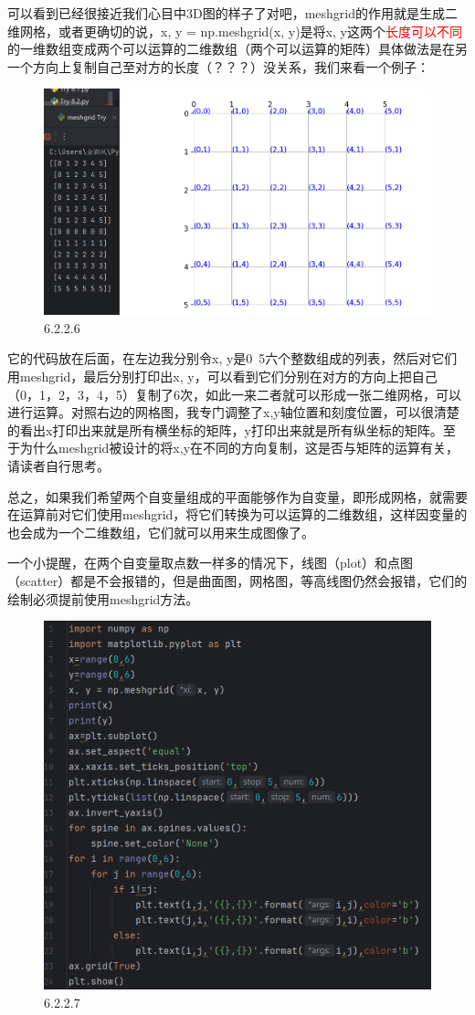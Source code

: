 \documentclass[12pt]{article}
\begin{document}
可以看到已经很接近我们心目中3D图的样子了对吧，meshgrid的作用就是生成二维网格，或者更确切的说，x, y = np.meshgrid(x, y)是将x, y这两个\textcolor{red}{长度可以不同}的一维数组变成两个可以运算的二维数组（两个可以运算的矩阵）具体做法是在另一个方向上复制自己至对方的长度（？？？）没关系，我们来看一个例子：
\begin{figure}[H]
    \centering
    \includegraphics[width=1\linewidth]{3D mesh Pic3.png}
    \caption{6.2.2.6}
    \label{fig:enter-label}
\end{figure}
它的代码放在后面，在左边我分别令x, y是0~5六个整数组成的列表，然后对它们用meshgrid，最后分别打印出x, y，可以看到它们分别在对方的方向上把自己（0，1，2，3，4，5）复制了6次，如此一来二者就可以形成一张二维网格，可以进行运算。对照右边的网格图，我专门调整了x,y轴位置和刻度位置，可以很清楚的看出x打印出来就是所有横坐标的矩阵，y打印出来就是所有纵坐标的矩阵。至于为什么meshgrid被设计的将x,y在不同的方向复制，这是否与矩阵的运算有关，请读者自行思考。

总之，如果我们希望两个自变量组成的平面能够作为自变量，即形成网格，就需要在运算前对它们使用meshgrid，将它们转换为可以运算的二维数组，这样因变量的也会成为一个二维数组，它们就可以用来生成图像了。

一个小提醒，在两个自变量取点数一样多的情况下，线图（plot）和点图（scatter）都是不会报错的，但是曲面图，网格图，等高线图仍然会报错，它们的绘制必须提前使用meshgrid方法。
\begin{figure}[H]
    \centering
    \includegraphics[width=0.75\linewidth]{3D mesh program3.png}
    \caption{6.2.2.7}
    \label{fig:enter-label}
\end{figure}
\end{document}
